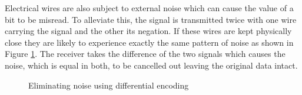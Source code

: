 			Electrical wires are also subject to external noise which can cause the
			value of a bit to be misread. To alleviate this, the signal is transmitted
			twice with one wire carrying the signal and the other its negation. If
			these wires are kept physically close they are likely to experience
			exactly the same pattern of noise as shown in Figure
			\ref{fig:differential-encoding}. The receiver takes the difference of the
			two signals which causes the noise, which is equal in both, to be
			cancelled out leaving the original data intact.
			
			\begin{figure}
				\center
				
				
				\caption{Eliminating noise using differential encoding}
				\label{fig:differential-encoding}
			\end{figure}

